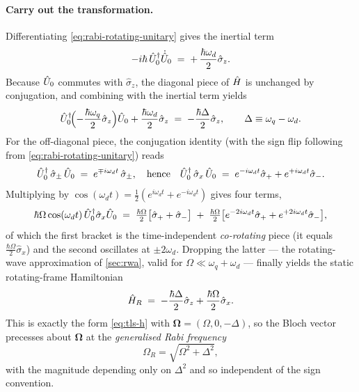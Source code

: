 \paragraph{Carry out the transformation.}
Differentiating \cref{eq:rabi-rotating-unitary} gives the inertial
term
\begin{equation}
-i\hbar\,\hat{U}_0^\dagger\dot{\hat{U}}_0
\;=\; +\,\frac{\hbar\omega_d}{2}\hat\sigma_z.
\end{equation}
Because $\hat{U}_0$ commutes with $\hat\sigma_z$, the diagonal piece
of $\hat{H}$ is unchanged by conjugation, and combining with the
inertial term yields
\begin{equation}
\hat{U}_0^\dagger\!\Bigl(-\frac{\hbar\omega_q}{2}\hat\sigma_z\Bigr)\hat{U}_0
+ \frac{\hbar\omega_d}{2}\hat\sigma_z
\;=\; -\frac{\hbar\Delta}{2}\hat\sigma_z,
\qquad \Delta\equiv\omega_q-\omega_d.
\end{equation}
For the off-diagonal piece, the conjugation identity (with the
sign flip following from \cref{eq:rabi-rotating-unitary}) reads
\begin{equation}
\hat{U}_0^\dagger\,\hat\sigma_\pm\,\hat{U}_0
\;=\; e^{\mp i\omega_d t}\,\hat\sigma_\pm,
\quad\text{hence}\quad
\hat{U}_0^\dagger\,\hat\sigma_x\,\hat{U}_0
\;=\; e^{-i\omega_d t}\hat\sigma_+ + e^{+i\omega_d t}\hat\sigma_-.
\end{equation}
Multiplying by
$\cos(\omega_d t)=\tfrac12(e^{i\omega_d t}+e^{-i\omega_d t})$ gives
four terms,
\begin{equation}
\hbar\Omega\cos(\omega_d t)\,\hat{U}_0^\dagger\hat\sigma_x\hat{U}_0
\;=\; \tfrac{\hbar\Omega}{2}\bigl[\hat\sigma_+ + \hat\sigma_- \bigr]
\;+\; \tfrac{\hbar\Omega}{2}\bigl[e^{-2i\omega_d t}\hat\sigma_+ + e^{+2i\omega_d t}\hat\sigma_-\bigr],
\end{equation}
of which the first bracket is the time-independent
\emph{co-rotating} piece (it equals
$\tfrac{\hbar\Omega}{2}\hat\sigma_x$) and the second oscillates at
$\pm 2\omega_d$. Dropping the latter --- the rotating-wave
approximation of \cref{sec:rwa}, valid for
$\Omega\ll\omega_q+\omega_d$ --- finally yields the static
rotating-frame Hamiltonian
\begin{equation}
\label{eq:rabi-h-rwa}
\hat{H}_R \;=\; -\frac{\hbar\Delta}{2}\hat\sigma_z + \frac{\hbar\Omega}{2}\hat\sigma_x.
\end{equation}
This is exactly the form \cref{eq:tls-h} with
$\bm{\Omega}=(\Omega,0,-\Delta)$, so the Bloch vector precesses
about $\bm{\Omega}$ at the \emph{generalised Rabi frequency}
\begin{equation}
\Omega_R = \sqrt{\Omega^2+\Delta^2},
\end{equation}
with the magnitude depending only on $\Delta^2$ and so independent
of the sign convention.

